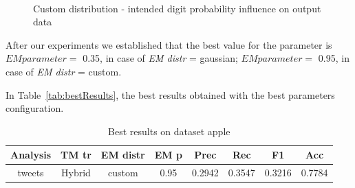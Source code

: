 \documentclass[12pt]{article}
\begin{document}
\begin{figure}[!htbp]
\centering
{} \hspace{35pt}
 \\
\caption{Custom distribution - intended digit probability influence on
output data}
\label{customG}
\end{figure}

After our experiments we established that the best value for the parameter is
$EM parameter =$ 0.35, in case of \emph{EM distr} = gaussian; $EM parameter =$
0.95, in case of \emph{EM distr} = custom.

In Table~\ref{tab:bestResults}, the best results obtained with the best
parameters configuration.

\begin{table}[htbp]
  \centering
    \begin{tabular}{cccccccc}
    \toprule
    \textbf{Analysis} & \textbf{TM tr} & \textbf{EM distr} & \textbf{EM p} & \textbf{Prec} & \textbf{Rec} & \textbf{F1} & \textbf{Acc} \\
    \midrule
    tweets & Hybrid & custom & 0.95  & 0.2942 & 0.3547 & 0.3216 & 0.7784 \\
    \bottomrule
    \end{tabular}%
  \caption{Best results on dataset apple}
\end{table}%
\label{tab:bestResults}%
\end{document}
